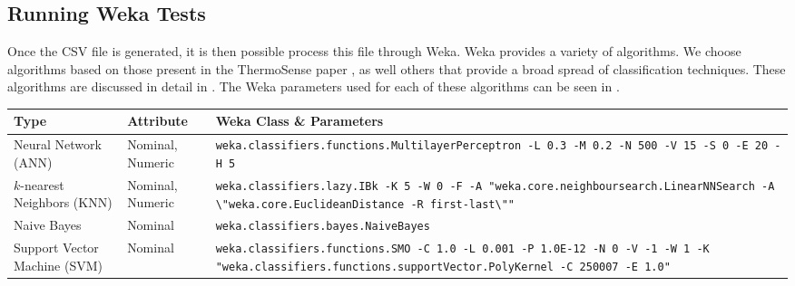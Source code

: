 \documentclass[../thesis/thesis.tex]{subfiles}
\begin{document}
\subsection{Running Weka Tests}
Once the CSV file is generated, it is then possible process this file through Weka. Weka provides a variety of algorithms. We choose algorithms based on those present in the ThermoSense paper \cite{beltran2013thermosense}, as well others that provide a broad spread of classification techniques. These algorithms are discussed in detail in . The Weka parameters used for each of these algorithms can be seen in .

\begin{table}[h]
\centering
\begin{tabular}{|p{40mm}|p{20mm}|p{70mm}|}
\hline
\textbf{Type} & \textbf{Attribute} & \textbf{Weka Class} \& \textbf{Parameters} \\ \hline

{Neural Network \newline (ANN)} & {Nominal, \newline Numeric} & \texttt{weka.classifiers.functions\newline.MultilayerPerceptron \newline -L 0.3 -M 0.2 -N 500 -V 15 \newline -S 0 -E 20 -H 5} \\ \hline

{$k$-nearest Neighbors \newline (KNN)} & Nominal, \newline Numeric & \texttt{weka.classifiers.lazy.IBk \newline -K 5 -W 0 -F \newline -A "weka.core.neighboursearch\newline.LinearNNSearch -A \textbackslash"weka.core\newline.EuclideanDistance \newline -R first-last\textbackslash""} \\ \hline

Naive Bayes & Nominal & \texttt{weka.classifiers.bayes.NaiveBayes} \\ \hline

{Support Vector \newline Machine (SVM)} & Nominal & \texttt{weka.classifiers.functions.SMO \newline -C 1.0 -L 0.001 -P 1.0E-12 \newline -N 0 -V -1 -W 1 \newline -K "weka.classifiers.functions\newline.supportVector.PolyKernel \newline-C 250007 -E 1.0"} \\ \hline


\end{tabular}
\end{table}
\end{document}
